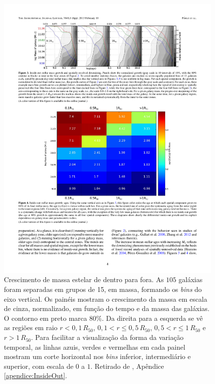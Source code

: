 \begin{figure}
	\includegraphics{figuras/inside-out}
	\caption[Crescimento da massa estelar de galáxias de dentro para fora]
	{Crescimento de massa estelar de dentro para fora. As $105$ galáxias foram
	separadas em grupos de 15, em massa, formando os {\em bins} do eixo vertical.
	Os painéis mostram o crescimento da massa em escala de cinza, normalizado, em
	função do tempo e da massa das galáxias. O contorno em preto marca $80\%$. Da
	direita para a esquerda se vê as regiões em raio $r < 0,1\,R_{50}$, $0,1 < r
	\leq 0,5\,R_{50}$, $0,5 < r \leq 1\,R_{50}$ e $r > 1\,R_{50}$. Para
	facilitar a visualização da forma da variação temporal, as linhas azuis, verdes
	e vermelhas em cada painel mostram um corte horizontal nos {\em bins} inferior,
	intermediário e superior, com escala de $0$ a $1$. Retirado de \cite[figura
	9]{Perez2013}, Apêndice \ref{apendice:InsideOut}.}
	\label{fig:insideOut}
\end{figure}

